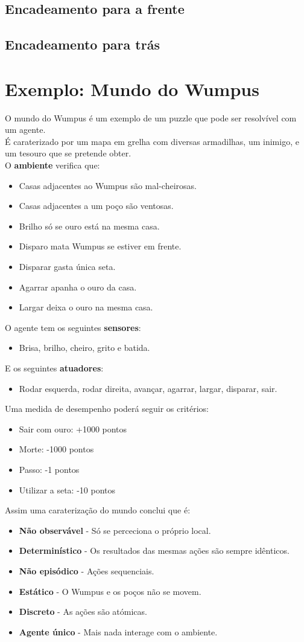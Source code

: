 \documentclass[]{report}
\begin{document}
\subsection{Encadeamento para a frente}
\subsection{Encadeamento para trás}
\pagebreak
\section{Exemplo: Mundo do Wumpus}
O mundo do Wumpus é um exemplo de um puzzle que pode ser resolvível com um agente.\\
É caraterizado por um mapa em grelha com diversas armadilhas, um inimigo, e um tesouro que se pretende obter.\\
O \textbf{ambiente} verifica que:
\begin{itemize}
\item Casas adjacentes ao Wumpus são mal-cheirosas.
\item Casas adjacentes a um poço são ventosas.
\item Brilho só se ouro está na mesma casa.
\item Disparo mata Wumpus se estiver em frente.
\item Disparar gasta única seta.
\item Agarrar apanha o ouro da casa.
\item Largar deixa o ouro na mesma casa.
\end{itemize}
O agente tem os seguintes \textbf{sensores}:
\begin{itemize}
\item Brisa, brilho, cheiro, grito e batida.
\end{itemize}
E os seguintes \textbf{atuadores}:
\begin{itemize}
\item Rodar esquerda, rodar direita, avançar, agarrar, largar, disparar, sair.
\end{itemize}
Uma medida de desempenho poderá seguir os critérios:
\begin{itemize}
\item Sair com ouro: +1000 pontos
\item Morte: -1000 pontos
\item Passo: -1 pontos
\item Utilizar a seta: -10 pontos
\end{itemize}
Assim uma caraterização do mundo conclui que é:
\begin{itemize}
\item \textbf{Não observável} - Só se perceciona o próprio local.
\item \textbf{Determinístico} - Os resultados das mesmas ações são sempre idênticos.
\item \textbf{Não episódico} - Ações sequenciais.
\item \textbf{Estático} - O Wumpus e os poços não se movem.
\item \textbf{Discreto} - As ações são atómicas.
\item \textbf{Agente único} - Mais nada interage com o ambiente.
\end{itemize}
\end{document}
